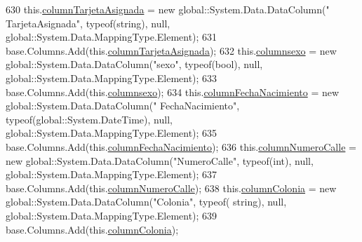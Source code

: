 \begin{DoxyCode}
630                 this.\hyperlink{class_proyecto___integrador__3_1_1ds_usuarios_1_1_usuarios_data_table_a504be60e812d907c7136a5e3851d016b}{columnTarjetaAsignada} = \textcolor{keyword}{new} global::System.Data.DataColumn(\textcolor{stringliteral}{"
      TarjetaAsignada"}, typeof(\textcolor{keywordtype}{string}), null, global::System.Data.MappingType.Element);
631                 base.Columns.Add(this.\hyperlink{class_proyecto___integrador__3_1_1ds_usuarios_1_1_usuarios_data_table_a504be60e812d907c7136a5e3851d016b}{columnTarjetaAsignada});
632                 this.\hyperlink{class_proyecto___integrador__3_1_1ds_usuarios_1_1_usuarios_data_table_ad45685f78c3413cf452abd3daff0df06}{columnsexo} = \textcolor{keyword}{new} global::System.Data.DataColumn(\textcolor{stringliteral}{"sexo"}, typeof(\textcolor{keywordtype}{bool}), null, 
      global::System.Data.MappingType.Element);
633                 base.Columns.Add(this.\hyperlink{class_proyecto___integrador__3_1_1ds_usuarios_1_1_usuarios_data_table_ad45685f78c3413cf452abd3daff0df06}{columnsexo});
634                 this.\hyperlink{class_proyecto___integrador__3_1_1ds_usuarios_1_1_usuarios_data_table_afa07fd5abd4cb0e2dc07590357818cb6}{columnFechaNacimiento} = \textcolor{keyword}{new} global::System.Data.DataColumn(\textcolor{stringliteral}{"
      FechaNacimiento"}, typeof(global::System.DateTime), null, global::System.Data.MappingType.Element);
635                 base.Columns.Add(this.\hyperlink{class_proyecto___integrador__3_1_1ds_usuarios_1_1_usuarios_data_table_afa07fd5abd4cb0e2dc07590357818cb6}{columnFechaNacimiento});
636                 this.\hyperlink{class_proyecto___integrador__3_1_1ds_usuarios_1_1_usuarios_data_table_a77c450d3e3d1fb155b43cc87e31803c2}{columnNumeroCalle} = \textcolor{keyword}{new} global::System.Data.DataColumn(\textcolor{stringliteral}{"NumeroCalle"},
       typeof(\textcolor{keywordtype}{int}), null, global::System.Data.MappingType.Element);
637                 base.Columns.Add(this.\hyperlink{class_proyecto___integrador__3_1_1ds_usuarios_1_1_usuarios_data_table_a77c450d3e3d1fb155b43cc87e31803c2}{columnNumeroCalle});
638                 this.\hyperlink{class_proyecto___integrador__3_1_1ds_usuarios_1_1_usuarios_data_table_a084b4a14639a4288451f402641cb4023}{columnColonia} = \textcolor{keyword}{new} global::System.Data.DataColumn(\textcolor{stringliteral}{"Colonia"}, typeof(\textcolor{keywordtype}{
      string}), null, global::System.Data.MappingType.Element);
639                 base.Columns.Add(this.\hyperlink{class_proyecto___integrador__3_1_1ds_usuarios_1_1_usuarios_data_table_a084b4a14639a4288451f402641cb4023}{columnColonia});

\end{DoxyCode}
